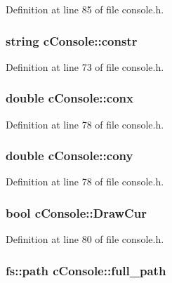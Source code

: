 Definition at line 85 of file console.\-h.

\hypertarget{classc_console_a7b45f6c466e2d18c1989625ad9a3c6a1}{
\subsubsection[{constr}]{\setlength{\rightskip}{0pt plus 5cm}string c\-Console\-::constr}}\label{classc_console_a7b45f6c466e2d18c1989625ad9a3c6a1}


Definition at line 73 of file console.\-h.

\hypertarget{classc_console_a5108a4c86028278c727a9ada9d7cad86}{
\subsubsection[{conx}]{\setlength{\rightskip}{0pt plus 5cm}double c\-Console\-::conx}}\label{classc_console_a5108a4c86028278c727a9ada9d7cad86}


Definition at line 78 of file console.\-h.

\hypertarget{classc_console_a6ee4b493deab76c932a37b191f4d9269}{
\subsubsection[{cony}]{\setlength{\rightskip}{0pt plus 5cm}double c\-Console\-::cony}}\label{classc_console_a6ee4b493deab76c932a37b191f4d9269}


Definition at line 78 of file console.\-h.

\hypertarget{classc_console_a762b7d2938fb4a1d031108176e9bb833}{
\subsubsection[{Draw\-Cur}]{\setlength{\rightskip}{0pt plus 5cm}bool c\-Console\-::\-Draw\-Cur}}\label{classc_console_a762b7d2938fb4a1d031108176e9bb833}


Definition at line 80 of file console.\-h.

\hypertarget{classc_console_a8c11548ebe909a12602b0b58f4c513dd}{
\subsubsection[{full\-\_\-path}]{\setlength{\rightskip}{0pt plus 5cm}fs\-::path c\-Console\-::full\-\_\-path}}\label{classc_console_a8c11548ebe909a12602b0b58f4c513dd}



